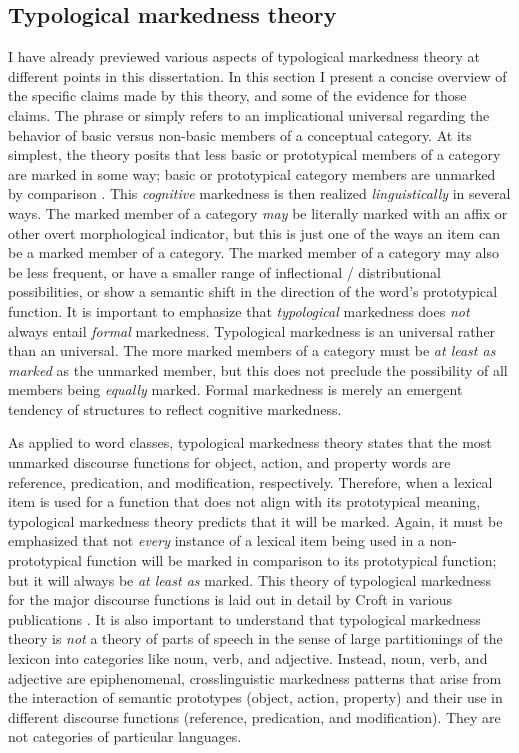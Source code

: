 \subsection{Typological markedness theory}
\label{sec:2.4.2}

I have already previewed various aspects of typological markedness theory at different points in this dissertation. In this section I present a concise overview of the specific claims made by this theory, and some of the evidence for those claims. The phrase  or  simply refers to an implicational universal regarding the behavior of basic versus non-basic members of a conceptual category. At its simplest, the theory posits that less basic or prototypical members of a category are marked in some way; basic or prototypical category members are unmarked by comparison \parencite{Greenberg1966}. This \emph{cognitive} markedness is then realized \emph{linguistically} in several ways. The marked member of a category \emph{may} be literally marked with an affix or other overt morphological indicator, but this is just one of the ways an item can be a marked member of a category. The marked member of a category may also be less frequent, or have a smaller range of inflectional / distributional possibilities, or show a semantic shift in the direction of the word's prototypical function. It is important to emphasize that \emph{typological} markedness does \emph{not} always entail \emph{formal} markedness. Typological markedness is an  universal rather than an  universal. The more marked members of a category must be \emph{at least as marked} as the unmarked member, but this does not preclude the possibility of all members being \emph{equally} marked. Formal markedness is merely an emergent tendency of structures to reflect cognitive markedness.

As applied to word classes, typological markedness theory states that the most unmarked discourse functions for object, action, and property words are reference, predication, and modification, respectively. Therefore, when a lexical item is used for a function that does not align with its prototypical meaning, typological markedness theory predicts that it will be marked. Again, it must be emphasized that not \emph{every} instance of a lexical item being used in a non-prototypical function will be marked in comparison to its prototypical function; but it will always be \emph{at least as} marked. This theory of typological markedness for the major discourse functions is laid out in detail by Croft in various publications \parencites{Croft1991}{Croft2000}{Croft2001b}{CroftLier2012}. It is also important to understand that typological markedness theory is \emph{not} a theory of parts of speech in the sense of large partitionings of the lexicon into categories like noun, verb, and adjective. Instead, noun, verb, and adjective are epiphenomenal, crosslinguistic markedness patterns that arise from the interaction of semantic prototypes (object, action, property) and their use in different discourse functions (reference, predication, and modification). They are not categories of particular languages.

